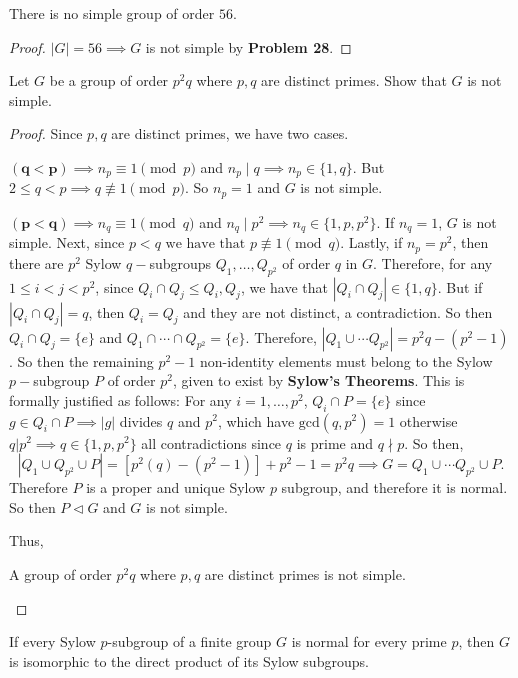\documentclass[addpoints,10pt]{exam}
\theoremstyle{plain}
\theoremstyle{definition}
\newtheorem{prob}[thm]{Problem}
\theoremstyle{plain}
\theoremstyle{plain}
\theoremstyle{definition}
\let\oldprob\prob
\let\endoldprob\endprob
\renewenvironment{prob}
  {\begin{singlespace}\oldprob}
  {\endoldprob\end{singlespace}}
\newcommand{\belowtitle}{\leavevmode\newline}
\begin{document}
\setcounter{thm}{32}   %
\begin{prob}\belowtitle
There is no simple group of order $56$.
\end{prob}

\begin{proof}
$|G|=56\implies G$ is not simple by \textbf{Problem 28}.

\end{proof}
\newpage
\setcounter{thm}{34}   %
\begin{prob}\belowtitle Let $G$ be a group of order $p^2 q$ where $p, q$ are distinct primes. Show that $G$ is not simple.\end{prob}

\begin{proof} Since $p,q$ are distinct primes, we have two cases.

  $\mathbf{(q<p)}\implies n_{p}\equiv 1\pmod{p}$ and $n_{p}\mid q\implies n_{p}\in \{1,q\}$. But $2\leq q<p\implies q\not\equiv 1\pmod{p}$. So $n_{p}=1$ and $G$ is not simple.

  $\mathbf{(p<q)}\implies n_{q}\equiv 1\pmod{q}$ and $n_{q}\mid p^{2}\implies n_{q}\in \{1,p,p^{2}\}$. If $n_{q}=1$, $G$ is not simple. Next, since $p<q\text{ we have that }p\not\equiv 1\pmod{q}$. Lastly, if $n_{p}=p^{2}$, then there are $p^{2}$ Sylow $q-$subgroups $Q_{1},\hdots, Q_{p^{2}}$ of order $q$ in $G$. Therefore, for any $1\leq i<j<p^{2}$, since $Q_{i}\cap Q_{j}\leq Q_{i},Q_{j}$, we have that $|Q_{i}\cap Q_{j}|\in \{1,q\}$. But if $|Q_{i}\cap Q_{j}|=q$, then $Q_{i}=Q_{j}$ and they are not distinct, a contradiction. So then $Q_{i}\cap Q_{j}=\{e\}$ and $Q_{1}\cap \cdots \cap Q_{p^{2}}=\{e\}.$ Therefore, $|Q_{1}\cup \cdots Q_{p^{2}}|=p^{2}q-(p^{2}-1)$. So then the remaining $p^{2}-1$ non-identity elements must belong to the Sylow $p-$subgroup $P$ of order $p^{2}$, given to exist by \textbf{Sylow's Theorems}. This is formally justified as follows: For any $i=1,\hdots, p^{2}$, $Q_{i}\cap P=\{e\}$ since $g\in Q_{i}\cap P\implies |g|$ divides $q$ and $p^{2}$, which have $\mathrm{gcd}(q,p^{2})=1$ otherwise $q|p^{2}\implies q\in \{1,p,p^{2}\}$ all contradictions since $q$ is prime and $q\nmid p$. So then,
  $$|Q_{1}\cup Q_{p^{2}}\cup P|=[p^{2}(q)-(p^{2}-1)]+p^{2}-1=p^{2}q\implies G=Q_{1}\cup \cdots Q_{p^{2}}\cup P.$$
  Therefore $P$ is a proper and unique Sylow $p$ subgroup, and therefore it is normal. So then $P\triangleleft G$ and $G$ is not simple.

  Thus,

  \begin{center}
  A group of order $p^{2}q$ where $p,q$ are distinct primes is not simple.
  \end{center}
\end{proof}
\newpage
\begin{prob}\belowtitle  If every Sylow $p$-subgroup of a finite group $G$ is normal for every prime $p$, then $G$ is isomorphic to the direct product of its Sylow subgroups.\end{prob}
\end{document}
